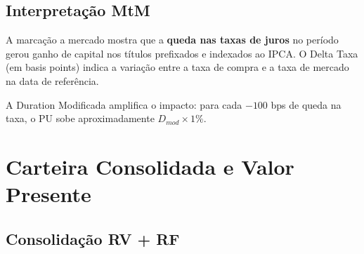 \documentclass[a4paper, 12pt]{article}
\begin{document}
\begin{table}[H]
\centering
\caption{Detalhamento dos títulos de renda fixa e marcação a mercado}
\label{tab:rf_detalhe}
\end{table}

\subsection{Interpretação MtM}
A marcação a mercado mostra que a \textbf{queda nas taxas de juros} no período gerou
ganho de capital nos títulos prefixados e indexados ao IPCA. O Delta Taxa (em basis points)
indica a variação entre a taxa de compra e a taxa de mercado na data de referência.

A Duration Modificada amplifica o impacto: para cada $-100$ bps de queda na taxa,
o PU sobe aproximadamente $D_{mod} \times 1\%$.

\newpage
\section{Carteira Consolidada e Valor Presente}

\subsection{Consolidação RV + RF}
\end{document}
